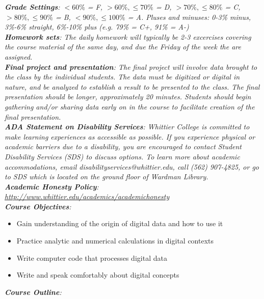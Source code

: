 \documentclass[10pt]{article}
\begin{document}
\textit{\textbf{Grade Settings}: $<60\%$ = F, $>60\%,\leq 70\%$ = D, $>70\%,\leq80\%$ = C, $>80\%,\leq 90\%$ = B, $<90\%,\leq 100\%$ = A.  Pluses and minuses: 0-3\% minus, 3\%-6\% straight, 6\%-10\% plus (e.g. 79\% = C+, 91\% = A-)} \\
\textit{\textbf{Homework sets}: The daily homework will typically be 2-3 excercises covering the course material of the same day, and due the Friday of the week the are assigned.} \\
\textit{\textbf{Final project and presentation}: The final project will involve data brought to the class by the individual students.  The data must be digitized or digital in nature, and be analyzed to establish a result to be presented to the class.  The final presentation should be longer, approximately 20 minutes.  Students should begin gathering and/or sharing data early on in the course to facilitate creation of the final presentation.} \\
\textit{\textbf{ADA Statement on Disability Services}: Whittier College is committed to make learning experiences as accessible as possible. If you experience physical or academic barriers due to a disability, you are encouraged to contact Student Disability Services (SDS) to discuss options. To learn more about academic accommodations, email disabilityservices@whittier.edu, call (562) 907-4825, or go to SDS which is located on the ground floor of Wardman Library.} \\
\textit{\textbf{Academic Honesty Policy}: \url{http://www.whittier.edu/academics/academichonesty}} \\
\textit{\textbf{Course Objectives}:}
\begin{itemize}
\item Gain understanding of the origin of digital data and how to use it
\item Practice analytic and numerical calculations in digital contexts
\item Write computer code that processes digital data
\item Write and speak comfortably about digital concepts
\end{itemize}
\clearpage
\textit{\textbf{Course Outline}:}
\end{document}
